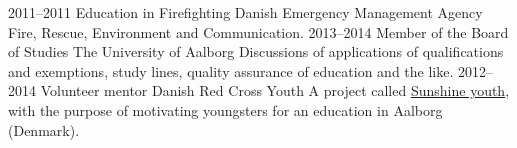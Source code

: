 \documentclass[]{friggeri-cv}
\begin{document}
\begin{entrylist}
  \entry
    {2011--2011}
    {Education in Firefighting}
    {Danish Emergency Management Agency}
    {Fire, Rescue, Environment and Communication.}
  \entry
    {2013--2014}
    {Member of the Board of Studies}
    {The University of Aalborg}
    {Discussions of applications of qualifications and exemptions, study lines, quality assurance of education and the like.}
  \entry
    {2012--2014}
    {Volunteer mentor}
    {Danish Red Cross Youth}
    {A project called \href{http://www.urk.dk/solskinsunge/}{Sunshine youth}, with the purpose of motivating youngsters for an education in Aalborg (Denmark).}
\end{entrylist}
\end{document}
